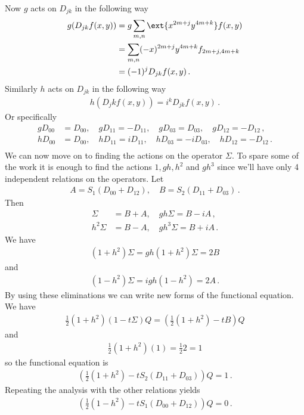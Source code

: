 Now $g$ acts on $D_{jk}$ in the following way
\begin{align}
	g(D_{jk}f(x,y)) &= g\sum_{m,n}\ext{x^{2m+j}y^{4m+k}}f(x,y)\\
			    &= \sum_{m,n}(-x)^{2m+j}y^{4m+k}f_{2m+j,4m+k}\\
			    &=(-1)^jD_{jk}f(x,y)\,.
\end{align}
Similarly $h$ acts on $D_{jk}$ in the following way
\begin{align}
	h(D_jk f(x,y)) = i^k D_{jk} f(x,y)\,.
\end{align}
Or specifically
\begin{align}
	g D_{00} &= D_{00},\quad gD_{11} = -D_{11},\quad g D_{03} = D_{03},\quad  g D_{12} = -D_{12}\,,\\
	h D_{00} &= D_{00},\quad hD_{11} = iD_{11},\quad h D_{03} =-i D_{03},\quad  h D_{12} = -D_{12}\,.\\
\end{align}
We can now move on to finding the actions on the operator $\Sigma$. To spare some of the work it is enough to find the actions $1,gh,h^2$ and $gh^3$ since we'll have only 4 independent relations on the operators. Let 
\begin{align}
	A = S_1(D_{00} + D_{12}),\quad B = S_2(D_{11}+D_{03})\,.
\end{align}
Then
\begin{align}
	\Sigma &= B+ A ,\quad gh\Sigma = B-iA\,,\\
	h^2\Sigma &= B - A ,\quad gh^3\Sigma =B+ iA\,.
\end{align}
We have
\begin{align}
	(1+h^2)\Sigma = gh(1+h^2)\Sigma = 2 B
\end{align}
and
\begin{align}
	(1-h^2)\Sigma = igh(1-h^2) = 2A\,.
\end{align}
By using these eliminations we can write new forms of the functional equation. We have
\begin{align}
	\frac{1}{2}(1+h^2)(1-t\Sigma)Q = \left(\frac{1}{2}(1+h^2)-tB\right)Q
\end{align}
and
\begin{align}
	\frac{1}{2}(1+h^2)(1) = \frac{1}{2}2 = 1
\end{align}
so the functional equation is
\begin{align}
	\left(\frac{1}{2}(1+h^2)-tS_2(D_{11}+D_{03})\right)Q = 1\,.
\end{align}
Repeating the analysis with the other relations yields
\begin{align}
	\left(\frac{1}{2}(1-h^2)-tS_1(D_{00}+D_{12})\right)Q = 0\,.
\end{align}

